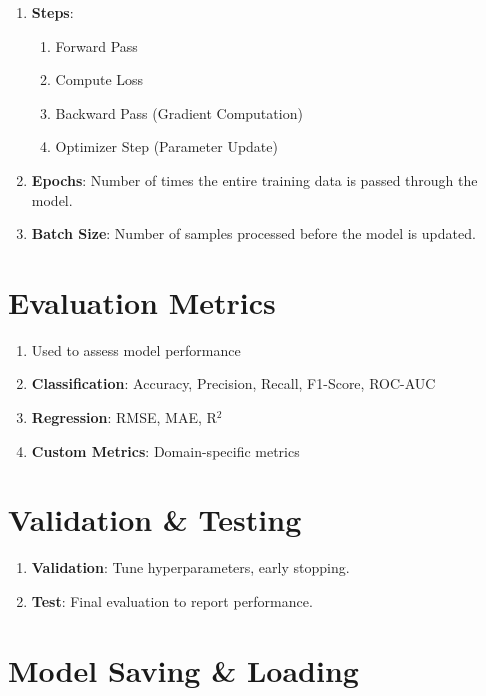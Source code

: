 \begin{enumerate}
    \item \textbf{Steps}:
    \begin{enumerate}
        \item Forward Pass
        \item Compute Loss
        \item Backward Pass (Gradient Computation)
        \item Optimizer Step (Parameter Update)
    \end{enumerate}

    \item \textbf{Epochs}: Number of times the entire training data is passed through the model.

    \item \textbf{Batch Size}: Number of samples processed before the model is updated.
\end{enumerate}




\section{Evaluation Metrics}

\begin{enumerate}
    \item Used to assess model performance
    \item \textbf{Classification}: Accuracy, Precision, Recall, F1-Score, ROC-AUC
    \item \textbf{Regression}: RMSE, MAE, R$^2$
    \item \textbf{Custom Metrics}: Domain-specific metrics
\end{enumerate}



\section{Validation \& Testing}

\begin{enumerate}
    \item \textbf{Validation}: Tune hyperparameters, early stopping.
    \item \textbf{Test}: Final evaluation to report performance.
\end{enumerate}



\section{Model Saving \& Loading}

